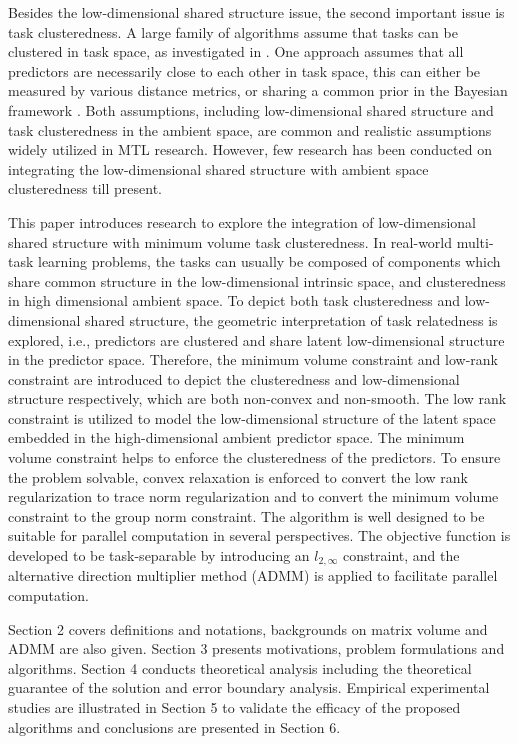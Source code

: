 \documentclass{article}
\newcounter{thm_counter}
\newcounter{lem_counter}
\newcounter{pro_counter}
\newcounter{ass_counter}
\begin{document}
Besides the low-dimensional shared structure issue, the second important
issue is  task clusteredness. A large family of algorithms assume
that tasks can be clustered in  task space, as investigated in \cite{cmtl:icml2012:flexiblecluster:zhong2012convex,cmtl:ICML2012:Kumar_690,cmtl:NIPS2008:bach,cmtl:nips2011:zhou2011clustered}.
One approach assumes that all predictors are necessarily close to each other in
 task space, this can either be measured by various distance metrics, or sharing
a common prior in the Bayesian framework \cite{mtl:icml2005:yu2005learning,mtl:nips2005:ica:zhang2006learning}.
Both assumptions, including low-dimensional shared structure and task clusteredness in the ambient space, are common and realistic assumptions widely utilized in MTL research. 
However, few research has been conducted on integrating the low-dimensional shared structure with ambient space clusteredness till present.

This paper introduces research to explore the integration of low-dimensional
shared structure with minimum volume task clusteredness. In real-world
multi-task learning problems, the tasks can usually be composed of
components which share common structure in the low-dimensional intrinsic
space, and clusteredness in high dimensional ambient space. To depict both task clusteredness
and low-dimensional shared structure, the geometric
interpretation of task relatedness is explored, i.e., predictors are
clustered and share latent low-dimensional structure in the predictor
space. Therefore, the minimum volume constraint and low-rank
constraint are introduced to depict the clusteredness and low-dimensional structure
respectively, which are both non-convex and non-smooth. The low rank
constraint is utilized to model the low-dimensional structure of the
latent space embedded in the high-dimensional ambient predictor space.
The minimum volume constraint helps to enforce the clusteredness of
the predictors. To ensure the problem solvable, convex relaxation is
enforced to convert the low rank regularization to trace norm regularization and to convert the minimum volume constraint to the group
norm constraint. The algorithm is well designed to be suitable for parallel
computation in several perspectives. The objective function is developed
to be task-separable by introducing an $l_{2,\infty}$ constraint, and the alternative direction multiplier method
(ADMM) is applied to facilitate parallel computation.

Section 2 covers definitions and notations, backgrounds on matrix volume and ADMM are also given. Section 3 presents motivations, problem formulations
and algorithms. Section 4 conducts theoretical analysis including the theoretical guarantee of the solution and error boundary analysis.
Empirical experimental studies are illustrated in Section 5 to validate the efficacy of the proposed algorithms and conclusions are presented in Section 6.
\end{document}
